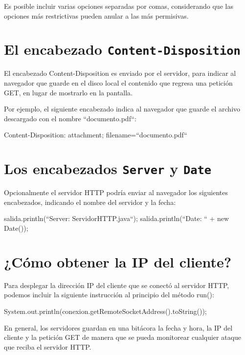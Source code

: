 Es posible incluir varias opciones separadas por comas, considerando que las opciones más restrictivas pueden anular a las más permisivas.

\section{El encabezado \texttt{Content-Disposition}}

El encabezado Content-Disposition es enviado por el servidor, para indicar al navegador que guarde en el disco local el contenido que regresa una petición GET, en lugar de mostrarlo en la pantalla.

Por ejemplo, el siguiente encabezado indica al navegador que guarde el archivo descargado con el nombre ``documento.pdf``:

\begin{SourceCode}
Content-Disposition: attachment; filename=``documento.pdf``
\end{SourceCode}

\section{Los encabezados \texttt{Server} y \texttt{Date}}

Opcionalmente el servidor HTTP podría enviar al navegador los siguientes encabezados, indicando el nombre del servidor y la fecha:

\begin{SourceCode}
salida.println(``Server: ServidorHTTP.java``);
salida.println(``Date: `` + new Date());
\end{SourceCode}

\section{¿Cómo obtener la IP del cliente?}

Para desplegar la dirección IP del cliente que se conectó al servidor HTTP, podemos incluir la siguiente instrucción al principio del método run():

\begin{SourceCode}
System.out.println(conexion.getRemoteSocketAddress().toString());
\end{SourceCode}

En general, los servidores guardan en una bitácora la fecha y hora, la IP del cliente y la petición GET de manera que se pueda monitorear cualquier ataque que reciba el servidor HTTP.

